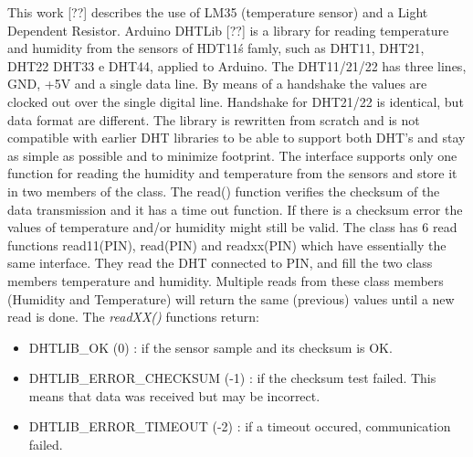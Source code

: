 \documentclass{acm_proc_article-sp}
\begin{document}
This work [??] describes the use of LM35 (temperature sensor) and a Light Dependent Resistor.
\newline
\newline
Arduino DHTLib [??] is a library for reading temperature and humidity from the sensors of HDT11\'s famly, such as DHT11, DHT21, DHT22 DHT33 e DHT44, applied to Arduino. 
\newline
\newline
The DHT11/21/22 has three lines, GND, +5V and a single data line. By means of a handshake the values are clocked out over the single digital line. Handshake for DHT21/22 is identical, but data format are different. The library is rewritten from scratch and is not compatible with earlier DHT libraries to be able to support both DHT's and stay as simple as possible and to minimize footprint.
\newline
\newline
The interface supports only one function for reading the humidity and temperature from the sensors and store it in two members of the class. The read() function verifies the checksum of the data transmission and it has a time out function. If there is a checksum error the values of temperature and/or humidity might still be valid.
\newline
\newline
The class has 6 read functions read11(PIN), read(PIN) and readxx(PIN) which have essentially the same interface. They read the DHT connected to PIN, and fill the two class members temperature and humidity. Multiple reads from these class members (Humidity and Temperature) will return the same (previous) values until a new read is done.
\newline
\newline
The \textit{readXX()} functions return:

\begin{itemize}
\item DHTLIB\_OK (0) : if the sensor sample and its checksum is OK.
\item DHTLIB\_ERROR\_CHECKSUM (-1) : if the checksum test failed. This means that data was received but may be incorrect.
\item DHTLIB\_ERROR\_TIMEOUT (-2) : if a timeout occured, communication failed.
\end{itemize}
\end{document}
